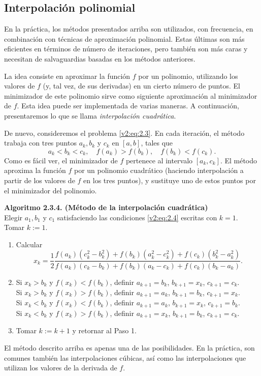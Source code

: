\subsection{Interpolación polinomial}

En la práctica, los métodos presentados arriba son utilizados, con frecuencia, en combinación con técnicas de aproximación polinomial. Estas últimas son más eficientes en términos de número de iteraciones, pero también son más caras y necesitan de salvaguardias basadas en los métodos anteriores.

La idea consiste en aproximar la función $f$ por un polinomio, utilizando los valores de $f$ (y, tal vez, de sus derivadas) en un cierto número de puntos. El minimizador de este polinomio sirve como siguiente aproximación al minimizador de $f$. Esta idea puede ser implementada de varias maneras. A continuación, presentaremos lo que se llama \textit{interpolación cuadrática}.

De nuevo, consideremos el problema \eqref{v2:eq:2.3}. En cada iteración, el método trabaja con tres puntos $a_k, b_k$ y $c_k$ en $[a, b]$, tales que
\begin{equation}
    a_k < b_k < c_k, \quad f(a_k) > f(b_k), \quad f(b_k) < f(c_k).
    \label{v2:eq:2.4}
\end{equation}
Como es fácil ver, el minimizador de $f$ pertenece al intervalo $[a_k, c_k]$. El método aproxima la función $f$ por un polinomio cuadrático (haciendo interpolación a partir de los valores de $f$ en los tres puntos), y sustituye uno de estos puntos por el minimizador del polinomio.

\noindent \textbf{Algoritmo 2.3.4. (Método de la interpolación cuadrática)} \\
Elegir $a_1, b_1$ y $c_1$ satisfaciendo las condiciones \eqref{v2:eq:2.4} escritas con $k=1$. Tomar $k := 1$.
\begin{enumerate}
    \item[1.] Calcular
    \[
        x_k = \frac{1}{2} \frac{f(a_k)(c_k^2 - b_k^2) + f(b_k)(a_k^2 - c_k^2) + f(c_k)(b_k^2 - a_k^2)}{f(a_k)(c_k - b_k) + f(b_k)(a_k - c_k) + f(c_k)(b_k - a_k)}.
    \]
    \item[2.] Si $x_k > b_k$ y $f(x_k) < f(b_k)$, definir $a_{k+1} = b_k$, $b_{k+1} = x_k$, $c_{k+1} = c_k$. \\
    Si $x_k > b_k$ y $f(x_k) > f(b_k)$, definir $a_{k+1} = a_k$, $b_{k+1} = b_k$, $c_{k+1} = x_k$. \\
    Si $x_k < b_k$ y $f(x_k) < f(b_k)$, definir $a_{k+1} = a_k$, $b_{k+1} = x_k$, $c_{k+1} = b_k$. \\
    Si $x_k < b_k$ y $f(x_k) > f(b_k)$, definir $a_{k+1} = x_k$, $b_{k+1} = b_k$, $c_{k+1} = c_k$.
    \item[3.] Tomar $k := k + 1$ y retornar al Paso 1.
\end{enumerate}

El método descrito arriba es apenas una de las posibilidades. En la práctica, son comunes también las interpolaciones cúbicas, así como las interpolaciones que utilizan los valores de la derivada de $f$.
